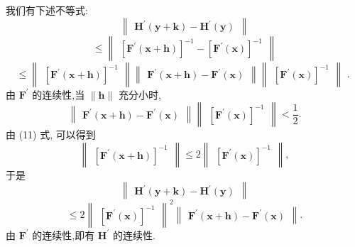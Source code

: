 我们有下述不等式:
\[
\begin{Vmatrix}{{\mathbf{H}}^{\prime }\left( {\mathbf{y} + \mathbf{k}}\right)  - {\mathbf{H}}^{\prime }\left( \mathbf{y}\right) }\end{Vmatrix}
\]
\[
\leq  \begin{Vmatrix}{{\left\lbrack  {\mathbf{F}}^{\prime }\left( \mathbf{x} + \mathbf{h}\right) \right\rbrack  }^{-1} - {\left\lbrack  {\mathbf{F}}^{\prime }\left( \mathbf{x}\right) \right\rbrack  }^{-1}}\end{Vmatrix}
\]
\[
\leq  \begin{Vmatrix}{\left\lbrack  {\mathbf{F}}^{\prime }\left( \mathbf{x} + \mathbf{h}\right) \right\rbrack  }^{-1}\end{Vmatrix}\begin{Vmatrix}{{\mathbf{F}}^{\prime }\left( {\mathbf{x} + \mathbf{h}}\right)  - {\mathbf{F}}^{\prime }\left( \mathbf{x}\right) }\end{Vmatrix}\begin{Vmatrix}{\left\lbrack  {\mathbf{F}}^{\prime }\left( \mathbf{x}\right) \right\rbrack  }^{-1}\end{Vmatrix}\text{ . } \tag{11}
\]
由 \({\mathbf{F}}^{\prime }\) 的连续性,当 \(\parallel \mathbf{h}\parallel\) 充分小时,
\[
\begin{Vmatrix}{{\mathbf{F}}^{\prime }\left( {\mathbf{x} + \mathbf{h}}\right)  - {\mathbf{F}}^{\prime }\left( \mathbf{x}\right) }\end{Vmatrix}\begin{Vmatrix}{\left\lbrack  {\mathbf{F}}^{\prime }\left( \mathbf{x}\right) \right\rbrack  }^{-1}\end{Vmatrix} < \frac{1}{2}.
\]
由 (11) 式, 可以得到
\[
\begin{Vmatrix}{\left\lbrack  {\mathbf{F}}^{\prime }\left( \mathbf{x} + \mathbf{h}\right) \right\rbrack  }^{-1}\end{Vmatrix} \leq  2\begin{Vmatrix}{\left\lbrack  {\mathbf{F}}^{\prime }\left( \mathbf{x}\right) \right\rbrack  }^{-1}\end{Vmatrix},
\]
于是
\[
\begin{Vmatrix}{{\mathbf{H}}^{\prime }\left( {\mathbf{y} + \mathbf{k}}\right)  - {\mathbf{H}}^{\prime }\left( \mathbf{y}\right) }\end{Vmatrix}
\]
\[
\leq  2{\begin{Vmatrix}{\left\lbrack  {\mathbf{F}}^{\prime }\left( \mathbf{x}\right) \right\rbrack  }^{-1}\end{Vmatrix}}^{2}\begin{Vmatrix}{{\mathbf{F}}^{\prime }\left( {\mathbf{x} + \mathbf{h}}\right)  - {\mathbf{F}}^{\prime }\left( \mathbf{x}\right) }\end{Vmatrix}.
\]
由 \({\mathbf{F}}^{\prime }\) 的连续性,即有 \({\mathbf{H}}^{\prime }\) 的连续性.

